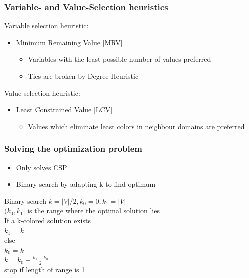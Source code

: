 \documentclass{beamer}
\begin{document}
\begin{frame}
    \frametitle{Variable- and Value-Selection heuristics}
	Variable selection heuristic:
	\begin{itemize}
	\item{Minimum Remaining Value [MRV]}
          \begin{itemize}
          \item{Variables with the least possible number of values preferred}
          \item{Ties are broken by Degree Heuristic}
          \end{itemize}
	\end{itemize}
	Value selection heuristic:
	\begin{itemize}
	\item{Least Constrained Value [LCV]}
          \begin{itemize}
          \item{Values which eliminate least colors in neighbour domains are preferred}
          \end{itemize}
          
	\end{itemize}
  \end{frame}

\begin{frame}
    \frametitle{Solving the optimization problem}
    \begin{itemize}
    \item{Only solves CSP}
	\item{Binary search by adapting k to find optimum}
	\end{itemize}
	\begin{block}{Binary search}
	$k = |V|/2, k_0 = 0, k_1 = |V|$\\
	$(k_0,k_1]$ is the range where the optimal solution lies\\
	If a k-colored solution exists\\
	\quad $k_1 = k$\\
	else\\
	\quad $k_0 = k$\\
	$k = k_0 + \frac{k_1 - k_0}{2}$\\
	stop if length of range is 1
	\end{block}
   \end{frame}
\end{document}
